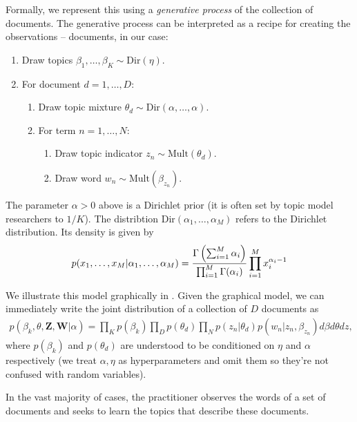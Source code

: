 Formally, we represent this using a \emph{generative process} of the
collection of documents.  The generative process can be interpreted as
a recipe for creating the observations -- documents, in our case:
\begin{enumerate}
  \item Draw topics $\beta_1, \ldots, \beta_K \sim \mbox{Dir}(\eta)$.
    \item For document $d=1, \ldots, D$:
    \begin{enumerate}
    \item Draw topic mixture $\theta_d \sim \mbox{Dir}(\alpha, \ldots, \alpha)$.
    \item For term $n=1, \ldots, N$:
      \begin{enumerate}
      \item Draw topic indicator $z_n \sim \mbox{Mult}(\theta_d)$.
      \item Draw word $w_n \sim \mbox{Mult}(\beta_{z_n})$.
      \end{enumerate}
    \end{enumerate}
\end{enumerate}
The parameter $\alpha > 0$ above is a Dirichlet prior (it is often set by
topic model researchers to $1/K$).  The distribtion $\mbox{Dir}(\alpha_1, \ldots, \alpha_M)$ refers to the Dirichlet distribution.  Its density is given by
\begin{align}
  p(x_1, \ldots, x_M | \alpha_1, \ldots, \alpha_M) =
  \frac{\large \Gamma \left( \sum_{i=1}^M \alpha_i \right)}
       {\prod_{i=1}^M \large \Gamma(\alpha_i)}
       \prod_{i=1}^M x_i^{\alpha_i - 1}
\end{align}

We illustrate this model graphically in .  Given the graphical model, we can immediately write the joint distribution of a collection of $D$ documents as
\begin{align}
  p(\beta_k, \theta, \bm Z, \bm W | \alpha) = 
  \prod_K p(\beta_k)
  \prod_D p(\theta_d) \prod_N p(z_n | \theta_d) p(w_n | z_n, \beta_{z_n}) d\beta d\theta dz,
\end{align}
where $p(\beta_k)$ and $p(\theta_d)$ are understood to be conditioned
on $\eta$ and $\alpha$ respectively (we treat $\alpha, \eta$ as
hyperparameters and omit them so they're not confused with random
variables).

In the vast majority of cases, the practitioner observes the words of
a set of documents and seeks to learn the topics that describe these
documents.

